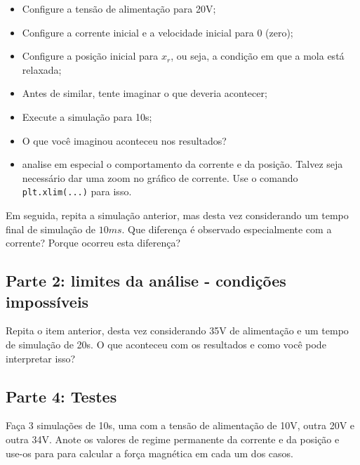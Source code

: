 \documentclass[a4paper]{article}
\theoremstyle{definition}
\theoremstyle{plain}
\begin{document}
\begin{itemize}
\item Configure a tensão de alimentação para 20V;

\item Configure a corrente inicial e a velocidade inicial para 0 (zero);

\item Configure a posição inicial para $x_r$, ou seja, a condição em que a mola está relaxada;

\item Antes de similar, tente imaginar o que deveria acontecer;

\item Execute a simulação para 10s;

\item O que você imaginou aconteceu nos resultados?

\item analise em especial o comportamento da corrente e da posição. Talvez seja necessário dar uma zoom no gráfico de corrente. Use o comando \verb|plt.xlim(...)| para isso. 
\end{itemize}


Em seguida, repita a simulação anterior, mas desta vez considerando um tempo final de simulação de $10ms$. Que diferença é observado especialmente com a corrente? Porque ocorreu esta diferença?


\subsection{Parte 2: limites da análise - condições impossíveis}

Repita o item anterior, desta vez considerando 35V de alimentação e um tempo de simulação de 20s. O que aconteceu com os resultados e como você pode interpretar isso?



\subsection{Parte 4: Testes}

Faça 3 simulações de 10s, uma com a tensão de alimentação de 10V, outra 20V e outra 34V. Anote os valores de regime permanente da corrente e da posição e use-os para para calcular a força magnética em cada um dos casos.





\end{document}
